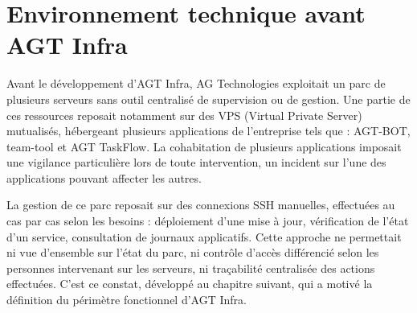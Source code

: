 \section{Environnement technique avant AGT Infra}

Avant le développement d'AGT Infra, AG Technologies exploitait un parc de
plusieurs serveurs sans outil centralisé de supervision ou de gestion. Une
partie de ces ressources reposait notamment sur des VPS (Virtual Private
Server) mutualisés, hébergeant plusieurs applications de l'entreprise tels que : AGT-BOT,
team-tool et AGT TaskFlow. La cohabitation de plusieurs applications imposait une vigilance particulière lors de toute
intervention, un incident sur l'une des applications pouvant affecter les
autres.

La gestion de ce parc reposait sur des connexions SSH manuelles, effectuées
au cas par cas selon les besoins : déploiement d'une mise à jour,
vérification de l'état d'un service, consultation de journaux applicatifs.
Cette approche ne permettait ni vue d'ensemble sur l'état du parc, ni
contrôle d'accès différencié selon les personnes intervenant sur les
serveurs, ni traçabilité centralisée des actions effectuées. C'est ce
constat, développé au chapitre suivant, qui a motivé la définition du
périmètre fonctionnel d'AGT Infra.